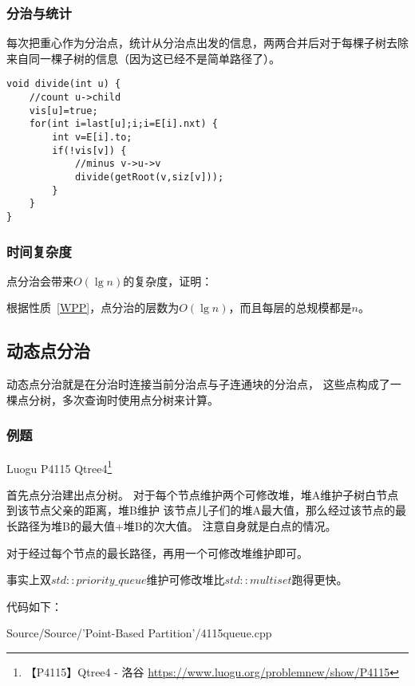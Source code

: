 \subsubsection{分治与统计}
每次把重心作为分治点，统计从分治点出发的信息，两两合并后对于每棵子树去除
来自同一棵子树的信息（因为这已经不是简单路径了）。

\begin{lstlisting}[title=divide]
void divide(int u) {
    //count u->child
    vis[u]=true;
    for(int i=last[u];i;i=E[i].nxt) {
        int v=E[i].to;
        if(!vis[v]) {
            //minus v->u->v
            divide(getRoot(v,siz[v]));
        }
    }
}
\end{lstlisting}

\subsubsection{时间复杂度}
点分治会带来$O(\lg n)$的复杂度，证明：

根据性质~\ref{WPP}，点分治的层数为$O(\lg n)$，而且每层的总规模都是$n$。

\subsection{动态点分治}
动态点分治就是在分治时连接当前分治点与子连通块的分治点，
这些点构成了一棵点分树，多次查询时使用点分树来计算。

\subsubsection{例题}

Luogu P4115 Qtree4\footnote{【P4115】Qtree4 - 洛谷
\url{https://www.luogu.org/problemnew/show/P4115}}

首先点分治建出点分树。
对于每个节点维护两个可修改堆，堆A维护子树白节点到该节点父亲的距离，堆B维护
该节点儿子们的堆A最大值，那么经过该节点的最长路径为堆B的最大值+堆B的次大值。
注意自身就是白点的情况。

对于经过每个节点的最长路径，再用一个可修改堆维护即可。

事实上双$std::priority\_queue$维护可修改堆比$std::multiset$跑得更快。

代码如下：

{Source/Source/'Point-Based Partition'/4115queue.cpp}
